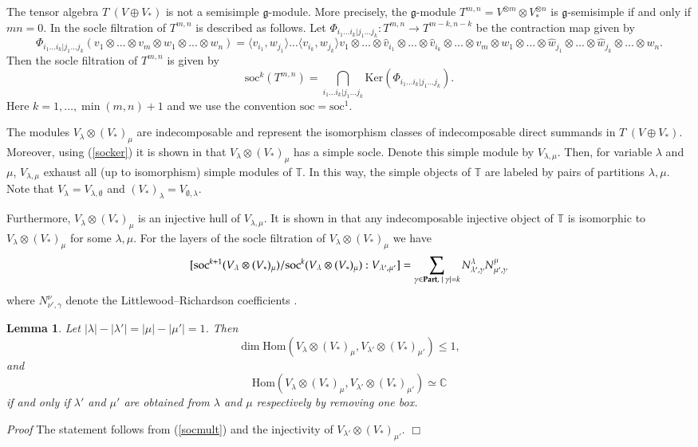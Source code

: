 \documentclass[11pt]{amsart}
\newcounter{theorem}
\newtheorem{lemma}[theo]{Lemma}
\renewenvironment{proof}{ \emph{Proof}}{$\Box$}
\newcommand{\TT}{\mathbb{T}}
\renewcommand{\gg}{\mathfrak{g}}
\newcommand{\soc}{\mathrm{soc}}
\newcommand{\Ker}{\mathrm{Ker}}
\newcommand{\Hom}{\mathrm{Hom}}
\begin{document}
The tensor algebra $T^\cdot(V\oplus V_*)$ is not a semisimple
$\gg$-module. More precisely, the $\gg$-module $T^{m,n}=V^{\otimes m}\otimes V_*^{\otimes n}$
is $\gg$-semisimple if and only if $mn=0$. In \cite{PStyr} the socle
filtration of $T^{m,n}$ is described as follows. 
Let $\Phi_{i_1...i_k|j_1...j_k}: T^{m,n}\rightarrow T^{m-k,n-k}$
be the contraction map given by 
$$\Phi_{i_1...i_k|j_1...j_k}(v_1\otimes ...\otimes v_m\otimes w_1\otimes ...\otimes w_n)=\langle v_{i_1}, w_{j_1} \rangle ...\langle v_{i_k}, w_{j_k} \rangle v_1\otimes ...\otimes\hat{v}_{i_1}\otimes ...\otimes\hat{v}_{i_k}\otimes ...\otimes v_m\otimes w_1\otimes ...\otimes\hat{w}_{j_1}\otimes ...\otimes\hat{w}_{j_k}\otimes ...\otimes w_n.$$
Then the socle filtration of $T^{m,n}$ is given by
\begin{equation}\label{socker}
\soc^{k}(T^{m,n})=\bigcap_{i_1...i_k|j_1...j_k}\Ker(\Phi_{i_1...i_k|j_1...j_k}).
\end{equation}
Here $k=1,\dots,\operatorname{min}(m,n)+1$ and we use the convention $\soc=\soc^1$.

The modules $V_\lambda\otimes(V_*)_\mu$ are indecomposable and represent
the isomorphism classes of indecomposable direct summands in
$T^\cdot(V\oplus V_*)$. Moreover, using (\ref{socker}) it is shown in
\cite{PStyr} that $V_\lambda\otimes (V_*)_\mu$ has a simple
socle. Denote this simple module by $V_{\lambda,\mu}$. Then, for variable $\lambda$ and $\mu$,
$V_{\lambda,\mu}$ exhaust all (up to isomorphism) simple modules of
$\TT$. In this
way, the simple objects of $\mathbb T$ are labeled by pairs of
partitions $\lambda,\mu$. Note that 
$V_\lambda=V_{\lambda,\emptyset}$ and $(V_*)_\lambda=V_{\emptyset,\lambda}$.

Furthermore, $V_\lambda\otimes (V_*)_\mu$  is an injective hull of
$V_{\lambda,\mu}$. It is shown in \cite{DPS} that any indecomposable
injective object of $\TT$ is isomorphic to $V_\lambda\otimes (V_*)_\mu$ for
some $\lambda,\mu$.
For the layers of the socle filtration of $V_\lambda\otimes (V_*)_\mu$ we have
\begin{equation}\label{socmult}
[\soc^{k+1}(V_\lambda\otimes  (V_*)_\mu)/\soc^{k}(V_\lambda\otimes(V_*)_\mu):V_{\lambda',\mu'}]=
\sum_{\gamma\in\bold{Part},\;|\;\gamma|=k}N^\lambda_{\lambda',\gamma}N^\mu_{\mu',\gamma}
\end{equation}
where $N^\nu_{\nu',\gamma}$ denote the Littlewood--Richardson
coefficients \cite{PStyr}. 
\begin{lemma}\label{dimhom} Let $|\lambda|-|\lambda'|=|\mu|-|\mu'|=1$.
Then 
$$\operatorname{dim}\Hom(V_\lambda\otimes (V_*)_\mu,V_{\lambda'}\otimes (V_*)_{\mu'})\leq 1,$$
and 
$$\Hom(V_\lambda\otimes (V_*)_\mu,V_{\lambda'}\otimes(V_*)_{\mu'})\simeq\mathbb C$$
if and only if $\lambda'$ and $\mu'$ are obtained from $\lambda$ and
$\mu$ respectively by removing one box.
\end{lemma}
\begin{proof} The statement follows from (\ref{socmult}) and the 
  injectivity of $V_{\lambda'}\otimes (V_*)_{\mu'}$. 
\end{proof}
\end{document}
